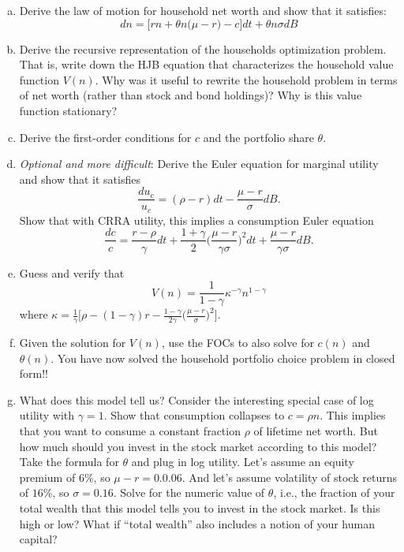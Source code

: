 \documentclass[11pt]{extarticle}
\theoremstyle{plain}
\theoremstyle{definition}
\begin{document}
\vspace{5mm}
\begin{enumerate}[(a)]
\item Derive the law of motion for household net worth and show that it satisfies:
\begin{equation*}
	dn = \bigg[ r n + \theta n \Big( \mu - r \Big) - c \bigg] dt + \theta n \sigma dB
\end{equation*}

\item Derive the recursive representation of the households optimization problem. That is, write down the HJB equation that characterizes the household value function $V(n)$. Why was it useful to rewrite the household problem in terms of net worth (rather than stock and bond holdings)? Why is this value function stationary?

\item Derive the first-order conditions for $c$ and the portfolio share $\theta$.

\item \textit{Optional and more difficult}: Derive the Euler equation for marginal utility and show that it satisfies 
\begin{equation*}
	\frac{du_c}{u_c} = (\rho - r) dt - \frac{\mu - r}{\sigma} dB.
\end{equation*}
Show that with CRRA utility, this implies a consumption Euler equation 
\begin{equation*}
	\frac{dc}{c} = \frac{r - \rho}{\gamma} dt + \frac{1+\gamma}{2} \bigg( \frac{\mu - r}{\gamma \sigma} \bigg)^2 dt + \frac{\mu - r}{\gamma \sigma} dB.
\end{equation*}


\item Guess and verify that 
\begin{equation*}
	V(n) = \frac{1}{1-\gamma} \kappa^{-\gamma} n^{1-\gamma}
\end{equation*}
where $\kappa = \frac{1}{\gamma} \Big[ \rho - (1-\gamma)r - \frac{1-\gamma}{2\gamma} \Big( \frac{\mu-r}{\sigma} \Big)^2 \Big]$. 


\item Given the solution for $V(n)$, use the FOCs to also solve for $c(n)$ and $\theta(n)$. You have now solved the household portfolio choice problem in closed form!!


\item What does this model tell us? Consider the interesting special case of log utility with $\gamma = 1$. Show that consumption collapses to $c = \rho n$. This implies that you want to consume a constant fraction $\rho$ of lifetime net worth. But how much should you invest in the stock market according to this model? Take the formula for $\theta$ and plug in log utility. Let's assume an equity premium of $6\%$, so $\mu-r = 0.0.06$. And let's assume volatility of stock returns of $16\%$, so $\sigma = 0.16$. Solve for the numeric value of $\theta$, i.e., the fraction of your total wealth that this model tells you to invest in the stock market. Is this high or low? What if ``total wealth'' also includes a notion of your human capital?

\end{enumerate}
\end{document}

